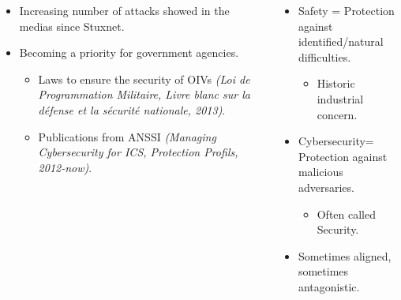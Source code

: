 \documentclass{beamer}
\newcommand{\Cybersec}{Cybersecurity\xspace}
\begin{document}
\begin{frame}[fragile]{}
\begin{columns}[T]
\begin{column}{.495\textwidth}
\begin{tcolorbox}[adjusted title={\centering\large Industrial Systems}, equal height group=K]
\begin{columns}
                \end{columns}
                \begin{itemize}
                    \item Increasing number of attacks showed in the medias since Stuxnet.
                    \item Becoming a priority for government agencies.
                    \begin{itemize}
                        \item Laws to ensure the security of OIVs {\em (Loi de Programmation Militaire, Livre blanc sur la défense et la sécurité nationale, 2013)}.
                        \item Publications from ANSSI {\em (Managing Cybersecurity for ICS, Protection Profils, 2012-now)}.
                    \end{itemize}
                \end{itemize}
            \end{tcolorbox}
        \end{column}
        \begin{column}{.495\textwidth}
            \begin{tcolorbox}[adjusted title={\centering\large Security concepts}, equal height group=K]
                \vspace{.25em}
                \begin{itemize}
                    \item Safety = Protection against identified/natural difficulties.
                    \begin{itemize}
                        \item Historic industrial concern.
                    \end{itemize}
                    \item \Cybersec = Protection against malicious adversaries.
                    \begin{itemize}
                        \item Often called Security.
                    \end{itemize}
                    \item Sometimes aligned, sometimes antagonistic.
                \end{itemize}


\end{tcolorbox}
\end{column}
\end{columns}
\end{frame}
\end{document}
